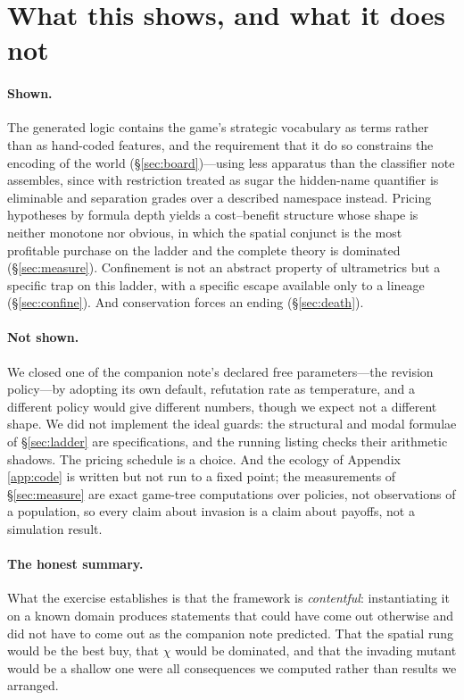 \documentclass[11pt]{article}
\theoremstyle{definition}
\theoremstyle{plain}
\theoremstyle{remark}
\begin{document}
\section{What this shows, and what it does not}

\paragraph{Shown.} The generated logic contains the game's strategic vocabulary
as terms rather than as hand-coded features, and the requirement that it do so
constrains the encoding of the world (\S\ref{sec:board})---using less apparatus
than the classifier note assembles, since with restriction treated as sugar the
hidden-name quantifier is eliminable and separation grades over a described
namespace instead. Pricing hypotheses by
formula depth yields a cost--benefit structure whose shape is neither monotone
nor obvious, in which the spatial conjunct is the most profitable purchase on
the ladder and the complete theory is dominated (\S\ref{sec:measure}).
Confinement is not an abstract property of ultrametrics but a specific trap on
this ladder, with a specific escape available only to a lineage
(\S\ref{sec:confine}). And conservation forces an ending (\S\ref{sec:death}).

\paragraph{Not shown.} We closed one of the companion note's declared free
parameters---the revision policy---by adopting its own default, refutation rate
as temperature, and a different policy would give different numbers, though we
expect not a different shape. We did not implement the ideal guards: the
structural and modal formulae of \S\ref{sec:ladder} are specifications, and the
running listing checks their arithmetic shadows. The pricing schedule is a
choice. And the ecology of Appendix \ref{app:code} is written but not run to a
fixed point; the measurements of \S\ref{sec:measure} are exact game-tree
computations over policies, not observations of a population, so every claim
about invasion is a claim about payoffs, not a simulation result.

\paragraph{The honest summary.} What the exercise establishes is that the
framework is \emph{contentful}: instantiating it on a known domain produces
statements that could have come out otherwise and did not have to come out as
the companion note predicted. That the spatial rung would be the best buy, that
$\chi$ would be dominated, and that the invading mutant would be a shallow one
were all consequences we computed rather than results we arranged.
\end{document}
